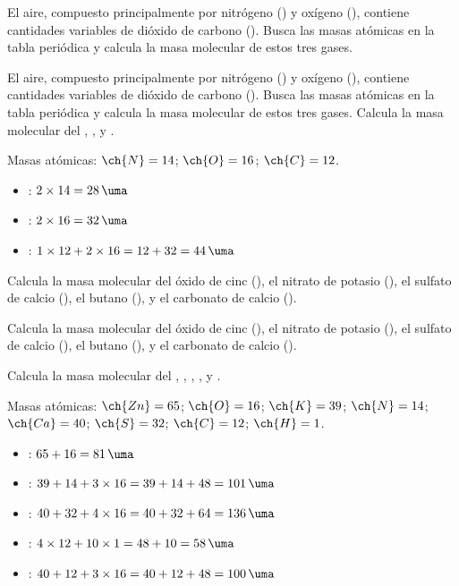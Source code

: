 \begin{exercise}
    El aire, compuesto principalmente por nitrógeno () y oxígeno (), contiene cantidades variables de dióxido de carbono (). Busca las masas atómicas en la tabla periódica y calcula la masa molecular de estos tres gases.
    \begin{solu}
        El aire, compuesto principalmente por nitrógeno () y oxígeno (), contiene cantidades variables de dióxido de carbono (). Busca las masas atómicas en la tabla periódica y calcula la masa molecular de estos tres gases.
        Calcula la masa molecular del , , y .

        Masas atómicas: \( \ch{N} = 14 \); \( \ch{O} = 16 \); \( \ch{C} = 12 \).

        \begin{itemize}
            \item {}: \( 2 \times 14 = \qty{28}{\uma} \)
            \item {}: \( 2 \times 16 = \qty{32}{\uma} \)
            \item {}: \( 1 \times 12 + 2 \times 16 = 12 + 32 = \qty{44}{\uma} \)
        \end{itemize}
    \end{solu}
\end{exercise}

\begin{exercise}
    Calcula la masa molecular del óxido de cinc (), el nitrato de potasio (), el sulfato de calcio (), el butano (), y el carbonato de calcio ().
    \begin{solu}
        Calcula la masa molecular del óxido de cinc (), el nitrato de potasio (), el sulfato de calcio (), el butano (), y el carbonato de calcio ().

        Calcula la masa molecular del , , , , y .

        Masas atómicas: \( \ch{Zn} = 65 \); \( \ch{O} = 16 \); \( \ch{K} = 39 \); \( \ch{N} = 14 \); \( \ch{Ca} = 40 \); \( \ch{S} = 32 \); \( \ch{C} = 12 \); \( \ch{H} = 1 \).
        \begin{itemize}
            \item {}: \( 65 + 16 = \qty{81}{\uma} \)
            \item {}: \( 39 + 14 + 3 \times 16 = 39 + 14 + 48 = \qty{101}{\uma} \)
            \item {}: \( 40 + 32 + 4 \times 16 = 40 + 32 + 64 = \qty{136}{\uma} \)
            \item {}: \( 4 \times 12 + 10 \times 1 = 48 + 10 = \qty{58}{\uma} \)
            \item {}: \( 40 + 12 + 3 \times 16 = 40 + 12 + 48 = \qty{100}{\uma} \)
        \end{itemize}
    \end{solu}
\end{exercise}

